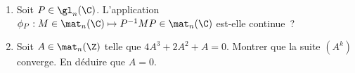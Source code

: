 \begin{enonce}
\begin{exercise}[ID={RMS124 E1227 ENSAM PSI},subtitle={},tags={}, difficulty={0}]
\begin{enumerate}
  \item Soit $P\in\gl_n(\C)$.
    L'application $\phi_P : M\in\mat_n(\C) \mapsto P^{-1}MP\in\mat_n(\C)$ est-elle continue~?
  \item Soit $A\in\mat_n(\Z)$ telle que $4A^3+2A^2+A=0$.
    Montrer que la suite $\left( A^k \right)$ converge.
    En déduire que $A=0$.
\end{enumerate}
\end{exercise}
\begin{solution}
\end{solution}
\end{enonce}
